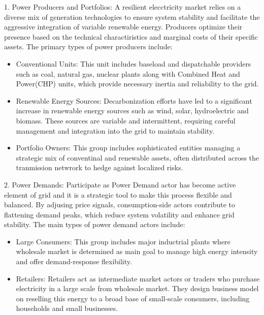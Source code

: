 1. Power Producers and Portfolios: A resilient elecctricity market relies on a diverse mix of generation technologies to ensure system stability and facilitate the aggressive integration of variable renewable energy. Producers optimize their presence based on the technical charactiristics and marginal costs of their specific assets. 
The primary types of power producers include: 
\begin{itemize}
    \item Conventional Units: This unit includes baseload and dispatchable providers such as coal, natural gas, nuclear plants along with Combined Heat and Power(CHP) units, which provide necessary inertia and reliability to the grid. 
    \item Renewable Energy Sources: Decarbonization efforts have led to a significant increase in renewable energy sources such as wind, solar, hydroelectric and biomass. These sources are variable and intermittent, requiring careful management and integration into the grid to maintain stability.
    \item Portfolio Owners: This group includes sophisticated entities managing a strategic mix of conventinal and renewable assets, often distributed across the tranmission netwrork to hedge against localized risks. 
\end{itemize}

2. Power Demands: Participate as Power Demand actor has become active element of grid and it is a strategic tool to make this process flexible and balanced. By adjusing price signals, consumption-side actors contribute to flattening demand peaks, which reduce system volatility and enhance grid stability. The main types of power demand actors include:
\begin{itemize}
    \item Large Consumers: This group includes major inductrial plants where wholesale market is determined as main goal to manage high energy intensity and offer demand-response flexibility.
    \item Retailers: Retailers act as intermediate market actors or traders who purchase electricity in a large scale from wholesale market. They design business model on reselling this energy to a broad base of small-scale consumers,  including households and small businesses.
\end{itemize}

